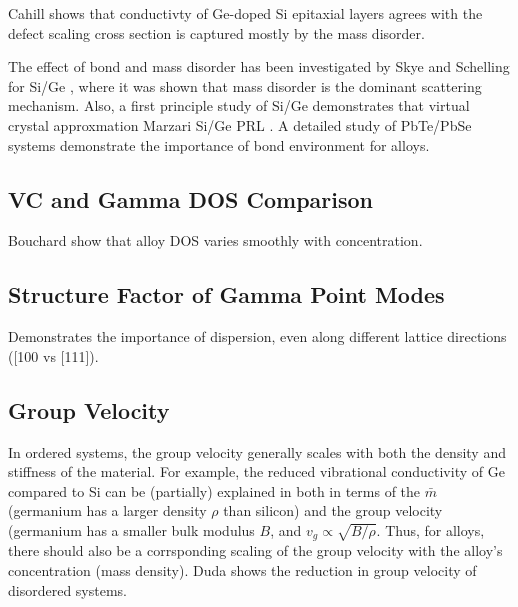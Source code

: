 \documentclass[aps,prb,preprint,superscriptaddress,amsmath,amssymb,floatfix]{revtex4}
\begin{document}
Cahill shows that conductivty of Ge-doped Si epitaxial layers agrees with 
the defect scaling cross section is captured mostly by the mass disorder.
\cite{cahill_thermal_2004}

The effect of bond and mass disorder has been investigated by Skye and 
Schelling for  
Si/Ge \cite{skye_thermal_2008}, where it was shown that mass disorder is 
the dominant scattering mechanism. Also, a first principle study of Si/Ge
demonstrates that virtual crystal approxmation Marzari 
Si/Ge PRL \cite{garg_role_2011}.  
A detailed study of PbTe/PbSe systems demonstrate the importance 
of bond environment for alloys.\cite{garg_phonon_2012}
\subsection{\label{S:}VC and Gamma DOS Comparison}
Bouchard show that alloy DOS varies smoothly with concentration.
\cite{bouchard_vibrational_1988}
\subsection{\label{S:}Structure Factor of Gamma Point Modes}
Demonstrates the importance of dispersion, even along different lattice 
directions ([100 vs [111]).
\subsection{\label{S:}Group Velocity}
In ordered systems, the group velocity generally scales with both the 
density and stiffness of the material. For example, 
the reduced vibrational conductivity of Ge compared to Si can 
be (partially) explained in both in terms of the $\bar m$ 
(germanium has a larger density $\rho$ than silicon) 
and the group velocity (germanium has a smaller bulk modulus $B$, 
and $v_g \propto \sqrt{B/\rho}$.
Thus, for alloys, there should also be a corrsponding scaling 
of the group velocity with the alloy's concentration (mass
density).
Duda shows the reduction in group velocity of disordered systems.
\cite{duda_reducing_2011}
\end{document}
